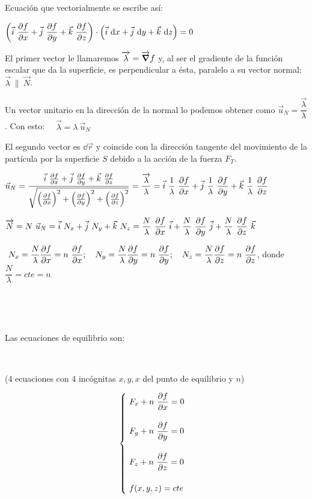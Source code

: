 Ecuación que vectorialmente se escribe así:

$\displaystyle \left( \vec i \ \pdv{f}{x} + \vec j \ \pdv{f}{y} +\vec k \ \pdv{f}{z} \right) \cdot \left( \vec i \ \dd x+ \vec j \ \dd y + \vec k \ \dd z \right)=0$


El primer vector le llamaremos $\overrightarrow{\lambda}=\overrightarrow{\grad}f$ y, al ser el gradiente de la función escalar que da la superficie, es perpendicular a ésta, paralelo a su vector normal: $\overrightarrow{\lambda}\ \parallel \ \overrightarrow{N}$. 

Un vector unitario en la dirección de la normal lo podemos obtener como $\vec u_N=\dfrac{\overrightarrow{\lambda}}{\lambda}$. Con esto: $\quad \overrightarrow{\lambda}=\lambda \ \vec u_N$

El segundo vector es $\dd \vec r$ y coincide con la dirección tangente del movimiento de la partícula por la superficie $S$ debido a la acción de la fuerza $F_T$.

$\vec u_N=\displaystyle \dfrac { \vec i \ \pdv{f}{x} + \vec j \ \pdv{f}{y} +\vec k \ \pdv{f}{z} }{\sqrt{ \left(\pdv{f}{x} \right)^2 + \left(\pdv{f}{y} \right)^2 + \left(\pdv{f}{z} \right)^2 }} =  \dfrac{\overrightarrow{\lambda}}{\lambda}= \vec i \ \dfrac 1 \lambda \ \pdv{f}{x} + \vec j \ \dfrac 1 \lambda \ \pdv{f}{y} +\vec k \ \dfrac 1 \lambda \ \pdv{f}{z}$


$\displaystyle \overrightarrow{N}=N\ \vec u_N=\vec i \ N_x+\vec j \ N_y+\vec k \ N_z= \dfrac N \lambda \ \pdv{f}{x} \ \vec i +  \dfrac N \lambda \ \pdv{f}{y} \ \vec j + \dfrac N \lambda \ \pdv{f}{z} \ \vec k$

$\ \displaystyle N_x=\dfrac N \lambda \pdv{f}{x} = n\ \pdv{f}{x}; \quad \displaystyle N_y=\dfrac N \lambda \pdv{f}{y} = n\ \pdv{f}{y}; \quad \displaystyle N_z=\dfrac N \lambda \pdv{f}{z} = n\ \pdv{f}{z}$, donde $\dfrac N \lambda = cte = n$

\vspace{30mm} %

\begin{multicols}{2}
$\quad$

$\quad$

Las ecuaciones de equilibrio son: 

$\quad$

(4 ecuaciones con 4 incógnitas $x,y,x$ del punto de equilibrio y $n$)

$$\displaystyle
\begin{cases}
\displaystyle \ F_x+n\ \pdv{f}{x}=0 \\ \\ \displaystyle \ F_y+n\ \pdv{f}{y}=0 \\  \\ \displaystyle \ F_z+n\ \pdv{f}{z}=0 \\ \\ \ f(x,y,z)=cte
\end{cases}$$
\end{multicols}


